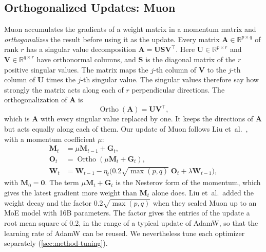 \subsection{Orthogonalized Updates: Muon}
\label{sec:background-muon}
Muon \cite{jordan2024muon} accumulates the gradients of a weight matrix in a momentum matrix and \emph{orthogonalizes} the result before using it as the update. Every matrix $\mathbf{A} \in \mathbb{R}^{p \times q}$ of rank $r$ has a singular value decomposition $\mathbf{A} = \mathbf{U} \mathbf{S} \mathbf{V}^{\top}$. Here $\mathbf{U} \in \mathbb{R}^{p \times r}$ and $\mathbf{V} \in \mathbb{R}^{q \times r}$ have orthonormal columns, and $\mathbf{S}$ is the diagonal matrix of the $r$ positive singular values. The matrix maps the $j$-th column of $\mathbf{V}$ to the $j$-th column of $\mathbf{U}$ times the $j$-th singular value. The singular values therefore say how strongly the matrix acts along each of $r$ perpendicular directions. The orthogonalization of $\mathbf{A}$ is
\begin{equation}[eq:ortho]{}
  \operatorname{Ortho}(\mathbf{A}) = \mathbf{U} \mathbf{V}^{\top},
\end{equation}
which is $\mathbf{A}$ with every singular value replaced by one. It keeps the directions of $\mathbf{A}$ but acts equally along each of them. Our update of Muon follows Liu et~al.~\cite{liu2025moonlight}, with a momentum coefficient $\mu$:
\begin{equation}[eq:muon-update]{}
  \begin{aligned}
    \mathbf{M}_t & = \mu \mathbf{M}_{t-1} + \mathbf{G}_t,                                                                                    \\
    \mathbf{O}_t & = \operatorname{Ortho}(\mu \mathbf{M}_t + \mathbf{G}_t),                                                                  \\
    \mathbf{W}_t & = \mathbf{W}_{t-1} - \eta_t \bigl( 0.2 \sqrt{\max(p, q)} \; \mathbf{O}_t + \lambda \mathbf{W}_{t-1} \bigr),
  \end{aligned}
\end{equation}
with $\mathbf{M}_0 = \mathbf{0}$. The term $\mu \mathbf{M}_t + \mathbf{G}_t$ is the Nesterov form of the momentum, which gives the latest gradient more weight than $\mathbf{M}_t$ alone does. Liu et~al.\ added the weight decay and the factor $0.2 \sqrt{\max(p, q)}$ when they scaled Muon up to an MoE model with 16B parameters. The factor gives the entries of the update a root mean square of 0.2, in the range of a typical update of AdamW, so that the learning rate of AdamW can be reused. We nevertheless tune each optimizer separately (\cref{sec:method-tuning}).

